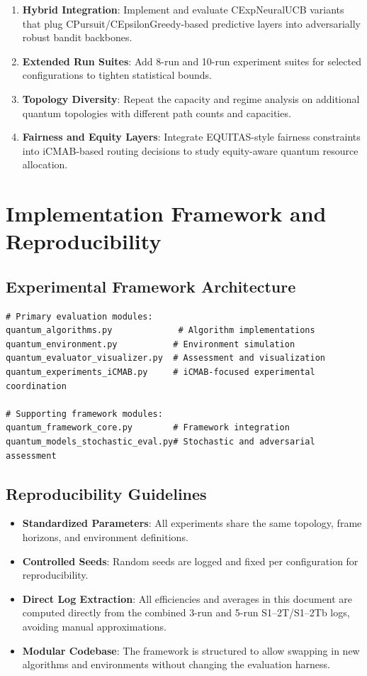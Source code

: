 \documentclass[12pt,a4paper]{article}
\begin{document}
\begin{enumerate}
\item \textbf{Hybrid Integration}: Implement and evaluate CExpNeuralUCB variants that plug CPursuit/CEpsilonGreedy-based predictive layers into adversarially robust bandit backbones.
\item \textbf{Extended Run Suites}: Add 8-run and 10-run experiment suites for selected configurations to tighten statistical bounds.
\item \textbf{Topology Diversity}: Repeat the capacity and regime analysis on additional quantum topologies with different path counts and capacities.
\item \textbf{Fairness and Equity Layers}: Integrate EQUITAS-style fairness constraints into iCMAB-based routing decisions to study equity-aware quantum resource allocation.
\end{enumerate}

\section{Implementation Framework and Reproducibility}

\subsection{Experimental Framework Architecture}

\begin{lstlisting}[caption=Core Framework Components]
# Primary evaluation modules:
quantum_algorithms.py             # Algorithm implementations
quantum_environment.py           # Environment simulation
quantum_evaluator_visualizer.py  # Assessment and visualization
quantum_experiments_iCMAB.py     # iCMAB-focused experimental coordination

# Supporting framework modules:
quantum_framework_core.py        # Framework integration
quantum_models_stochastic_eval.py# Stochastic and adversarial assessment
\end{lstlisting}

\subsection{Reproducibility Guidelines}

\begin{itemize}
\item \textbf{Standardized Parameters}: All experiments share the same topology, frame horizons, and environment definitions.
\item \textbf{Controlled Seeds}: Random seeds are logged and fixed per configuration for reproducibility.
\item \textbf{Direct Log Extraction}: All efficiencies and averages in this document are computed directly from the combined 3-run and 5-run S1–2T/S1–2Tb logs, avoiding manual approximations.
\item \textbf{Modular Codebase}: The framework is structured to allow swapping in new algorithms and environments without changing the evaluation harness.
\end{itemize}
\end{document}
